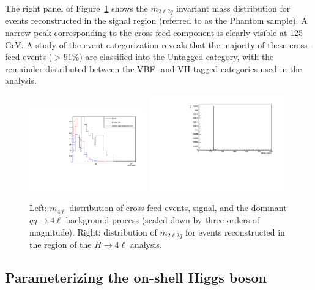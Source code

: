 The right panel of Figure~\ref{fig:crossfeed} shows the $m_{2\ell2q}$ invariant mass distribution for events reconstructed in the \offshell signal region (referred to as the Phantom sample). A narrow peak corresponding to the \onshell cross-feed component is clearly visible at 125\,GeV. A study of the event categorization reveals that the majority of these cross-feed events (\(>91\%\)) are classified into the Untagged category, with the remainder distributed between the VBF- and VH-tagged categories used in the analysis.


\begin{figure}[!hbt]
\centering
\includegraphics[width=0.45\textwidth]{figures/M4L_proj_incl.pdf}
\includegraphics[width=0.52\textwidth]{figures/phantomm2l2q.pdf}
\caption {
Left: $m_{4\ell}$ distribution of \onshell cross-feed events, \offshell signal, and the dominant 
$q\bar{q} \to 4\ell$ background process (scaled down by three orders of magnitude).
Right: distribution of $m_{2\ell2q}$ for events reconstructed in the \offshell region 
of the $H\to 4\ell$ analysis. 
\label{fig:crossfeed}}
\end{figure}

\subsection{Parameterizing the on-shell Higgs boson} \label{sec:onshell}

